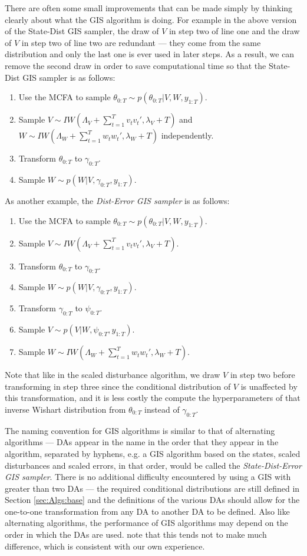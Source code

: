 \documentclass{article}
\begin{document}
There are often some small improvements that can be made simply by thinking clearly about what the GIS algorithm is doing. For example in the above version of the State-Dist GIS sampler, the draw of $V$ in step two of line one and the draw of $V$ in step two of line two are redundant --- they come from the same distribution and only the last one is ever used in later steps. As a result, we can remove the second draw in order to save computational time so that the State-Dist GIS sampler is as follows:
\begin{enumerate}
\item Use the MCFA to sample $\theta_{0:T} \sim p(\theta_{0:T}|V,W,y_{1:T})$.
\item Sample $V \sim IW\left(\Lambda_V + \sum_{t=1}^Tv_tv_t',\lambda_V + T\right)$ and $W \sim IW\left(\Lambda_W + \sum_{t=1}^Tw_tw_t',\lambda_{W} + T\right)$ independently.
\item Transform $\theta_{0:T}$ to $\gamma_{0:T}$.
\item Sample $W \sim p(W|V,\gamma_{0:T},y_{1:T})$.
\end{enumerate}
As another example, the {\it Dist-Error GIS sampler} is as follows:
\begin{enumerate}
\item Use the MCFA to sample $\theta_{0:T} \sim p(\theta_{0:T}|V,W,y_{1:T})$.
\item Sample $V \sim IW\left(\Lambda_V + \sum_{t=1}^Tv_tv_t',\lambda_V + T\right)$.
\item Transform $\theta_{0:T}$ to $\gamma_{0:T}$.
\item Sample $W \sim p(W|V,\gamma_{0:T},y_{1:T})$.
\item Transform $\gamma_{0:T}$ to $\psi_{0:T}$.
\item Sample $V \sim p(V|W,\psi_{0:T},y_{1:T})$.
\item Sample $W \sim IW\left(\Lambda_W + \sum_{t=1}^Tw_tw_t',\lambda_{W} + T\right)$.
\end{enumerate}
Note that like in the scaled disturbance algorithm, we draw $V$ in step two before transforming in step three since the conditional distribution of $V$ is unaffected by this transformation, and it is less costly the compute the hyperparameters of that inverse Wishart distribution from $\theta_{0:T}$ instead of $\gamma_{0:T}$.

The naming convention for GIS algorithms is similar to that of alternating algorithms --- DAs appear in the name in the order that they appear in the algorithm, separated by hyphens, e.g. a GIS algorithm based on the states, scaled disturbances and scaled errors, in that order, would be called the {\it State-Dist-Error GIS sampler}. There is no additional difficulty encountered by using a GIS with greater than two DAs --- the required conditional distributions are still defined in Section \ref{sec:Algs:base} and the definitions of the various DAs should allow for the one-to-one transformation from any DA to another DA to be defined.  Also like alternating algorithms, the performance of GIS algorithms may depend on the order in which the DAs are used.  note that this tends not to make much difference, which is consistent with our own experience.
\end{document}
